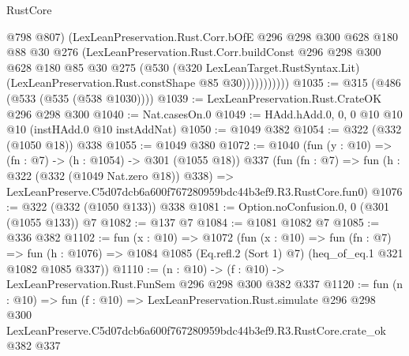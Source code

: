 \begin{lexlean}{RustCore}
\begin{coremodule}
                    @798
                    @807)
                  (LexLeanPreservation.Rust.Corr.bOfE
                    @296
                    @298
                    @300
                    @628
                    @180
                    @88
                    @30
                    @276
                    (LexLeanPreservation.Rust.Corr.buildConst
                      @296
                      @298
                      @300
                      @628
                      @180
                      @85
                      @30
                      @275
                      (@530
                        (@320 LexLeanTarget.RustSyntax.Lit)
                        (LexLeanPreservation.Rust.constShape @85 @30)))))))))))
@1035 := @315 (@486 (@533 (@535 (@538 @1030))))
@1039 := LexLeanPreservation.Rust.CrateOK @296 @298 @300
@1040 := Nat.casesOn.{0}
@1049 := HAdd.hAdd.{0, 0, 0} @10 @10 @10 (instHAdd.{0} @10 instAddNat)
@1050 := @1049 @382
@1054 := @322 (@332 (@1050 @18)) @338
@1055 := @1049 @380
@1072 := @1040
    (fun (y : @10) => (fn : @7) -> (h : @1054) -> @301 (@1055 @18))
    @337
    (fun (fn : @7) =>
    fun (h : @322 (@332 (@1049 Nat.zero @18)) @338) =>
    LexLeanPreserve.C5d07dcb6a600f767280959bdc44b3ef9.R3.RustCore.fun0)
@1076 := @322 (@332 (@1050 @133)) @338
@1081 := Option.noConfusion.{0, 0} (@301 (@1055 @133)) @7
@1082 := @137 @7
@1084 := @1081 @1082 @7
@1085 := @336 @382
@1102 := fun (x : @10) =>
  @1072
    (fun (x : @10) =>
    fun (fn : @7) =>
    fun (h : @1076) => @1084 @1085 (Eq.refl.{2} (Sort 1) @7) (heq_of_eq.{1} @321 @1082 @1085 @337))
@1110 := (n : @10) -> (f : @10) -> LexLeanPreservation.Rust.FunSem @296 @298 @300 @382 @337
@1120 := fun (n : @10) =>
  fun (f : @10) =>
  LexLeanPreservation.Rust.simulate
    @296
    @298
    @300
    LexLeanPreserve.C5d07dcb6a600f767280959bdc44b3ef9.R3.RustCore.crate_ok
    @382
    @337
\end{coremodule}
\end{lexlean}
